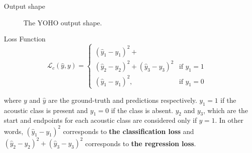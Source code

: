 \begin{frame}{Output shape}
\begin{figure}
			\caption{The YOHO output shape.}
			\label{fig:YOHOoutput}
		\end{figure}
		
	\end{frame}
	

	\begin{frame}{Loss Function}
		\begin{equation*}
			\mathcal{L}_{c}(\hat{y},y) = \begin{cases}
			(\hat{y}_1-y_1)^2+\\(\hat{y}_2-y_2)^2+(\hat{y}_3-y_3)^2 &\text{if $y_{1} = 1$}\\
			(\hat{y}_1-y_1)^2, &\text{if $y_1 = 0$}
			\end{cases}
		\end{equation*}
		
		where $y$ and $\hat{y}$ are the ground-truth and predictions respectively. $y_1 = 1$ if the acoustic class is present and $y_1 = 0$ if the class is absent. $y_2$ and $y_3$, which are the start and endpoints for each acoustic class are considered only if $y = 1$.
		In other words, $(\hat{y}_1-y_1)^2$ corresponds to \textbf{the classification loss} and $(\hat{y}_2-y_2)^2+(\hat{y}_3-y_3)^2$ corresponds to \textbf{the regression loss}.
		\note{
			\dots
		}
	\end{frame}
	
